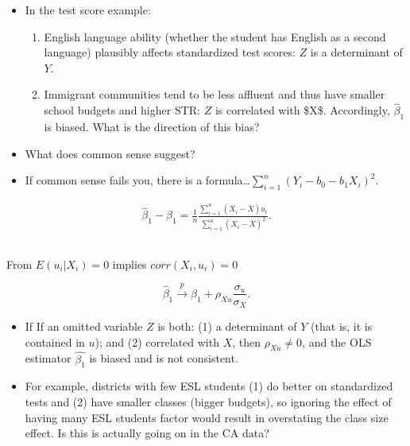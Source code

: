 \documentclass[
  letterpaper,
  DIV=11,
  numbers=noendperiod]{scrartcl}
\providecommand{\tightlist}{%
  \setlength{\itemsep}{0pt}\setlength{\parskip}{0pt}}\usepackage{longtable,booktabs,array}
\begin{document}
\begin{itemize}
\item
  In the test score example:

  \begin{enumerate}
  \def\labelenumi{\arabic{enumi}.}
  \tightlist
  \item
    English language ability (whether the student has English as a
    second language) plausibly affects standardized test scores: \(Z\)
    is a determinant of \(Y\).
  \item
    Immigrant communities tend to be less affluent and thus have smaller
    school budgets and higher STR: \(Z\) is correlated with \$X\$.
    Accordingly, \(\hat\beta_1\) is biased. What is the direction of
    this bias?
  \end{enumerate}
\item
  What does common sense suggest?
\item
  If common sense fails you, there is a
  formula\ldots{}\(\sum^n_{i = 1} (Y_i - b_0 - b_1 X_i)^2\).
\end{itemize}

\[\begin{align}
{\hat\beta_1}-\beta_1 = \frac{1}{n} \frac{\sum^n_{i = 1}  \left(X_i - \bar{X} \right) u_i  }  {\sum^n_{i = 1}(X_i - \bar{X})^2}. \tag{6.1}
\end{align}\]

\hypertarget{section-1}{%
\subsection{}\label{section-1}}

From \(E(u_i\vert X_i) = 0\) implies \(corr(X_i,u_i)=0\)

\[\hat\beta_1 \xrightarrow[]{p} \beta_1 + \rho_{Xu} \frac{\sigma_u}{\sigma_X}. \tag{6.1}\]

\begin{itemize}
\item
  If If an omitted variable \(Z\) is both: (1) a determinant of \(Y\)
  (that is, it is contained in \(u\)); and (2) correlated with \(X\),
  then \(\rho_{Xu} \neq0\), and the OLS estimator \(\hat{\beta_1}\) is
  biased and is not consistent.
\item
  For example, districts with few ESL students (1) do better on
  standardized tests and (2) have smaller classes (bigger budgets), so
  ignoring the effect of having many ESL students factor would result in
  overstating the class size effect. Is this is actually going on in the
  CA data?
\end{itemize}
\end{document}
